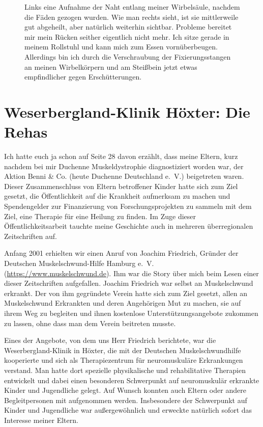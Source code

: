 \documentclass[fontsize=14pt,a4paper,headinclude,DIV=calc,automark]{scrbook}
\begin{document}
\setlength{\fboxsep}{0pt}    %
\setlength{\fboxrule}{0.2pt} %
\begin{figure}[H]
    \centering
    \caption{Links eine Aufnahme der Naht entlang meiner Wirbelsäule, nachdem die Fäden gezogen wurden. Wie man rechts sieht, ist sie mittlerweile gut abgeheilt, aber natürlich weiterhin sichtbar. Probleme bereitet mir mein Rücken seither eigentlich nicht mehr. Ich sitze gerade in meinem Rollstuhl und kann mich zum Essen vornüberbeugen. Allerdings bin ich durch die Verschraubung der Fixierungsstangen an meinen Wirbelkörpern und am Steißbein jetzt etwas empfindlicher gegen Erschütterungen.}
    \label{fig:skoliose-op-naht}
\end{figure}

\section{Weserbergland-Klinik Höxter: Die Rehas}

Ich hatte euch ja schon auf Seite 28 davon erzählt, dass meine Eltern, kurz nachdem bei mir Duchenne Muskeldystrophie diagnostiziert worden war, der Aktion Benni \& Co. (heute Duchenne Deutschland e.~V.) beigetreten waren. Dieser Zusammenschluss von Eltern betroffener Kinder hatte sich zum Ziel gesetzt, die Öffentlichkeit auf die Krankheit aufmerksam zu machen und Spendengelder zur Finanzierung von Forschungsprojekten zu sammeln mit dem Ziel, eine Therapie für eine Heilung zu finden. Im Zuge dieser Öffentlichkeitsarbeit tauchte meine Geschichte auch in mehreren überregionalen Zeitschriften auf.

Anfang 2001 erhielten wir einen Anruf von Joachim Friedrich, Gründer der Deutschen Muskelschwund-Hilfe Hamburg e.~V. (\url{https://www.muskelschwund.de}). Ihm war die Story über mich beim Lesen einer dieser Zeitschriften aufgefallen. Joachim Friedrich war selbst an Muskelschwund erkrankt. Der von ihm gegründete Verein hatte sich zum Ziel gesetzt, allen an Muskelschwund Erkrankten und deren Angehörigen Mut zu machen, sie auf ihrem Weg zu begleiten und ihnen kostenlose Unterstützungsangebote zukommen zu lassen, ohne dass man dem Verein beitreten musste.

Eines der Angebote, von dem uns Herr Friedrich berichtete, war die We\-ser\-berg\-land-Klinik in Höxter, die mit der Deutschen Muskelschwundhilfe kooperierte und sich als Therapiezentrum für neuromuskuläre Erkrankungen verstand. Man hatte dort spezielle physikalische und rehabilitative Therapien entwickelt und dabei einen besonderen Schwerpunkt auf neuromuskulär erkrankte Kinder und Jugendliche gelegt. Auf Wunsch konnten auch Eltern oder andere Begleitpersonen mit aufgenommen werden. Insbesondere der Schwerpunkt auf Kinder und Jugendliche war außergewöhnlich und erweckte natürlich sofort das Interesse meiner Eltern.
\end{document}
